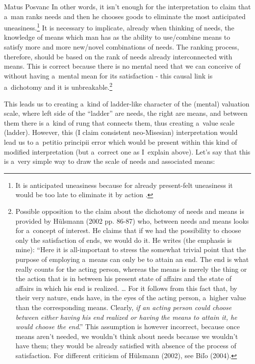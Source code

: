 \begin{artengenv}{Matus Posvanc}
In other words, it isn't enough for the interpretation to claim that a~man ranks needs and then he chooses goods to eliminate the most anticipated uneasiness.\footnote{It is anticipated uneasiness because for already present-felt uneasiness it would be too late to eliminate it by action 
\parencites[][]{Shackle1992Epistemics}[][]{Bilo2004Theory}.%
} It is necessary to implicate, already when thinking of needs, the knowledge of means which man has as the ability to use/combine means to satisfy more and more new/novel combinations of needs. The ranking process, therefore, should be based on the rank of needs already interconnected with means. This is correct because there is no mental need that we can conceive of without having a~mental mean for its satisfaction - this causal link is a~dichotomy and it is unbreakable.\footnote{Possible opposition to the claim about the dichotomy of needs and means is provided by Hülsmann (2002 pp. 86-87) who, between needs and means looks for a~concept of interest. He claims that if we had the possibility to choose only the satisfaction of ends, we would do it. He writes (the emphasis is mine): ``Here it is all-important to stress the somewhat trivial point that the purpose of employing a~means can only be to attain an end. The end is what really counts for the acting person, whereas the means is merely the thing or the action that is in between his present state of affairs and the state of affairs in which his end is realized. … For it follows from this fact that, by their very nature, ends have, in the eyes of the acting person, a~higher value than the corresponding means. Clearly, \textit{if an acting person could choose between either having his end realized or having the means to attain it, he would choose the end}.'' This assumption is however incorrect, because once means aren't needed, we wouldn't think about needs because we wouldn't have them; they would be already satisfied with absence of the process of satisfaction. For different criticism of Hülsmann (2002), see Biľo (2004).}



This leads us to creating a~kind of ladder-like character of the (mental) valuation scale, where left side of the ``ladder'' are needs, the right are means, and between them there is a~kind of rung that connects them, thus creating a~value scale (ladder). However, this (I claim consistent neo-Misesian) interpretation would lead us to a~petitio principii error which would be present within this kind of modified interpretation (but a~correct one as I~explain above). Let's say that this is a~very simple way to draw the scale of needs and associated means:



\end{artengenv}
